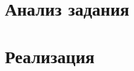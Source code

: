 \documentclass[12pt,a4paper]{report}
\begin{document}
	
	
	\renewcommand{\thesection}{\arabic{section}}
	\tableofcontents
	\pagebreak
	
	\setcounter{totalnumber}{10}
	\setcounter{topnumber}{10}
	\setcounter{bottomnumber}{10}
	\renewcommand{\topfraction}{1}
	\renewcommand{\textfraction}{0}
	
	
	\section{Анализ задания}
	
	
	
	\section{Реализация}
	
	
	
	
	
	
\end{document}

